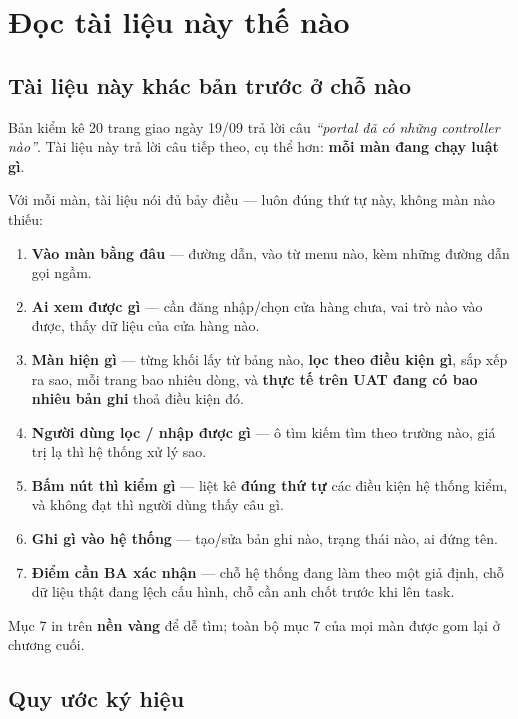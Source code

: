 \chapter{Đọc tài liệu này thế nào}

\section{Tài liệu này khác bản trước ở chỗ nào}

Bản kiểm kê 20 trang giao ngày 19/09 trả lời câu \emph{``portal đã có những controller nào''}.
Tài liệu này trả lời câu tiếp theo, cụ thể hơn: \textbf{mỗi màn đang chạy luật gì}.

Với mỗi màn, tài liệu nói đủ bảy điều --- luôn đúng thứ tự này, không màn nào thiếu:

\begin{enumerate}[leftmargin=*,itemsep=1pt]
  \item \textbf{Vào màn bằng đâu} --- đường dẫn, vào từ menu nào, kèm những đường dẫn gọi ngầm.
  \item \textbf{Ai xem được gì} --- cần đăng nhập/chọn cửa hàng chưa, vai trò nào vào được, thấy
        dữ liệu của cửa hàng nào.
  \item \textbf{Màn hiện gì} --- từng khối lấy từ bảng nào, \textbf{lọc theo điều kiện gì}, sắp
        xếp ra sao, mỗi trang bao nhiêu dòng, và \textbf{thực tế trên UAT đang có bao nhiêu bản
        ghi} thoả điều kiện đó.
  \item \textbf{Người dùng lọc / nhập được gì} --- ô tìm kiếm tìm theo trường nào, giá trị lạ thì
        hệ thống xử lý sao.
  \item \textbf{Bấm nút thì kiểm gì} --- liệt kê \textbf{đúng thứ tự} các điều kiện hệ thống
        kiểm, và không đạt thì người dùng thấy câu gì.
  \item \textbf{Ghi gì vào hệ thống} --- tạo/sửa bản ghi nào, trạng thái nào, ai đứng tên.
  \item \textbf{Điểm cần BA xác nhận} --- chỗ hệ thống đang làm theo một giả định, chỗ dữ liệu
        thật đang lệch cấu hình, chỗ cần anh chốt trước khi lên task.
\end{enumerate}

Mục 7 in trên \textbf{nền vàng} để dễ tìm; toàn bộ mục 7 của mọi màn được gom lại ở chương cuối.

\section{Quy ước ký hiệu}

